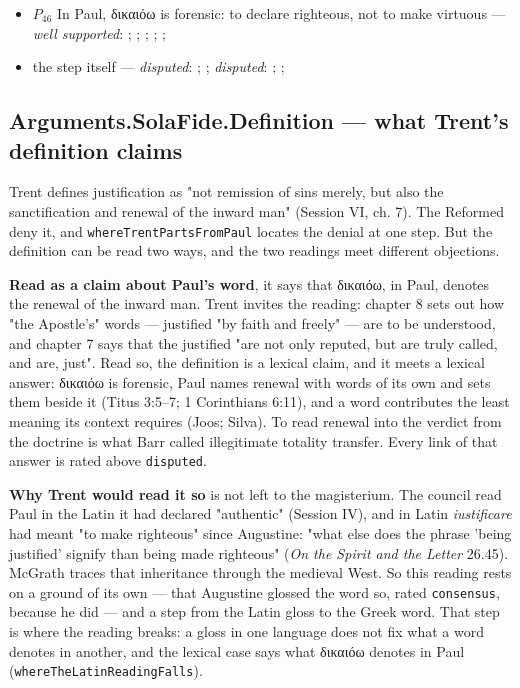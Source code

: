 \documentclass[11pt]{article}
\begin{document}
\begin{itemize}
\begin{itemize}
\item \(P_{46}\) In Paul, δικαιόω is forensic: to declare righteous, not to make virtuous --- \emph{well supported}: \cite[s.v. δικαιόω]{bauer-danker-lexicon-2000}; \cite{morris-apostolic-preaching-1965}; \cite[p. 80]{moo-romans-1996}; \cite{irons-righteousness-of-god-2015}; \cite{wright-justification-2009}; \cite[ad loc. Rom 3:24]{fitzmyer-romans-1993}
\item the step itself --- \emph{disputed}: \cite[ad loc. Gal 1:6]{moo-galatians-2013}; \cite[XI.1]{westminster-confession-1647}; \emph{disputed}: \cite[XI.1]{westminster-confession-1647}; \cite[III.xi.2]{calvin-institutes-1960}; \cite{morris-apostolic-preaching-1965}
\end{itemize}
\end{itemize}
\subsection*{Arguments.SolaFide.Definition — what Trent's definition claims}
Trent defines justification as "not remission of sins merely, but also the sanctification and renewal of the inward man" (Session VI, ch. 7). The Reformed deny it, and \texttt{where\allowbreak{}Trent\allowbreak{}Parts\allowbreak{}From\allowbreak{}Paul} locates the denial at one step. But the definition can be read two ways, and the two readings meet different objections.

\textbf{Read as a claim about Paul's word}, it says that δικαιόω, in Paul, denotes the renewal of the inward man. Trent invites the reading: chapter 8 sets out how "the Apostle's" words — justified "by faith and freely" — are to be understood, and chapter 7 says that the justified "are not only reputed, but are truly called, and are, just". Read so, the definition is a lexical claim, and it meets a lexical answer: δικαιόω is forensic, Paul names renewal with words of its own and sets them beside it (Titus 3:5–7; 1 Corinthians 6:11), and a word contributes the least meaning its context requires (Joos; Silva). To read renewal into the verdict from the doctrine is what Barr called illegitimate totality transfer. Every link of that answer is rated above \texttt{disputed}.

\textbf{Why Trent would read it so} is not left to the magisterium. The council read Paul in the Latin it had declared "authentic" (Session IV), and in Latin \emph{iustificare} had meant "to make righteous" since Augustine: "what else does the phrase 'being justified' signify than being made righteous" (\emph{On the Spirit and the Letter} 26.45). McGrath traces that inheritance through the medieval West. So this reading rests on a ground of its own — that Augustine glossed the word so, rated \texttt{consensus}, because he did — and a step from the Latin gloss to the Greek word. That step is where the reading breaks: a gloss in one language does not fix what a word denotes in another, and the lexical case says what δικαιόω denotes in Paul (\texttt{where\allowbreak{}The\allowbreak{}Latin\allowbreak{}Reading\allowbreak{}Falls}).
\end{document}

